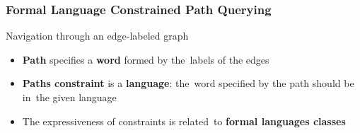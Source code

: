 \documentclass[xcolor=table,aspectratio=169]{beamer}
\begin{document}
\begin{frame}[fragile] \frametitle{Formal Language Constrained Path Querying}
      \begin{minipage}[m]{0.45\linewidth}
  \end{minipage}\hfill
  \begin{minipage}[m]{0.5\linewidth}
  Navigation through an edge-labeled graph

  \vfill

  \begin{itemize}
        \item \textbf{Path} specifies a \textbf{word} formed by the~labels of the edges
        \item \textbf{Paths constraint} is a \textbf{language}: the~word specified by the path should be in~the given language
        \item The expressiveness of constraints is related~to \textbf{formal languages classes}
  \end{itemize}
  \end{minipage}

\end{frame}
\end{document}
